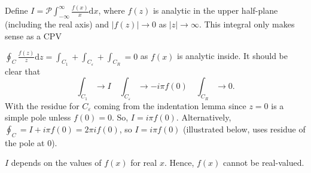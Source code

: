 \documentclass[a4paper]{article}
\begin{document}
\begin{eg}
        Define $I = \mathcal{P} \int_{-\infty}^{\infty} \frac{f(x)}{x} \text{d}x$, where $f(z)$ is analytic in the upper half-plane (including the real axis) and $|f(z)| \to 0$ as $|z| \to \infty $. This integral only makes sense as a CPV  
\begin{center}
\end{center}
$\oint_C \frac{f(z)}{z}\text{d}z = \int_{C_1} + \int_{C_\varepsilon} + \int_{C_R} = 0$ as $f(x) $ is analytic inside. 
It should be clear that
\[
    \int_{C_1} \to I  \quad  \int_{C_{\varepsilon}} \to - i \pi f(0)  \quad  \int_{C_R} \to 0
.\] 
With the residue for $C_{\varepsilon}$ coming from the indentation lemma since $z = 0$ is a simple pole unless $f(0) = 0$. So,  $I = i \pi f(0)$. Alternatively,
$\oint_{C} = I + i\pi f(0) = 2 \pi i f(0)$, so $I = i \pi f(0)$ (illustrated below, uses residue of the pole at 0).
\begin{center}
\end{center}

    \end{eg}
\begin{remark}
    $I$ depends on the values of $f(x)$ for real $x$. Hence, $f(x)$ cannot be real-valued.
\end{remark}
\end{document}
